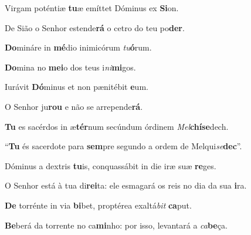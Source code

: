 \begin{greenumerate}
  \setcounter{enumi}{2}


  \item Virgam poténtiæ \textbf{tu}æ {\GreStar} emíttet Dóminus ex \textbf{Si}on. 

  \switchcolumn\setcounter{enumi}{2}

  \item De Sião o Senhor estende\textbf{rá} {\GreStar} o cetro do teu po\textbf{der}. 

  \switchcolumn*

  \item \textbf{Do}mináre in \textbf{mé}dio {\GreStar} inimicórum \textit{tu}\textbf{ó}rum. 

  \switchcolumn%

  \item \textbf{Do}mina no \textbf{mei}o {\GreStar} dos teus i\textit{ni}\textbf{mi}gos. 

  \switchcolumn*


  \item Iurávit \textbf{Dó}minus {\GreStar} et non pænitébit \textbf{e}um. 

  \switchcolumn%

  \item O Senhor ju\textbf{rou} {\GreStar} e não se arrepende\textbf{rá}. 

  \switchcolumn*

  \item \textbf{Tu} es sacérdos in æ\textbf{tér}num {\GreStar} secúndum órdinem \textit{Mel}\-\textbf{chíse}dech. 

  \switchcolumn%

  \item ``\textbf{Tu} és sacerdote para \textbf{sem}pre {\GreStar} segundo a ordem de Melqui\textit{se}\textbf{dec}''. 

  \switchcolumn*


  \item Dóminus a dextris \textbf{tu}is, {\GreStar} conquassábit in die iræ suæ \textbf{re}ges. 

  \switchcolumn%

  \item O Senhor está à tua di\textbf{rei}ta: {\GreStar} ele esmagará os reis no dia da sua \textbf{i}ra. 

  \switchcolumn*


  \item \textbf{De} torrénte in via \textbf{bi}bet, {\GreStar} proptérea exaltá\textit{bit} \textbf{ca}put. 

  \switchcolumn%

  \item \textbf{Be}berá da torrente no ca\textbf{mi}nho: {\GreStar} por isso, levantará a \textit{ca}\textbf{be}ça. 
\end{greenumerate}